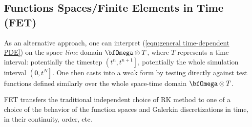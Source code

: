 \subsection{Functions Spaces/Finite Elements in Time (FET)}
    As an alternative approach, one can interpret (\ref{eqn:general time-dependent PDE}) on the space-\emph{time} domain $\bfOmega\otimes T$, where $T$ represents a time interval: potentially the timestep $\left(t^{n}, t^{n + 1}\right]$, potentially the whole simulation interval $\left(0, t^{N}\right]$. One then casts into a weak form by testing directly against test functions defined similarly over the whole space-time domain $\bfOmega\otimes T$.
    
    FET transfers the traditional independent choice of RK method to one of a choice of the behavior of the function spaces and Galerkin discretizations in time, in their continuity, order, etc.
    

